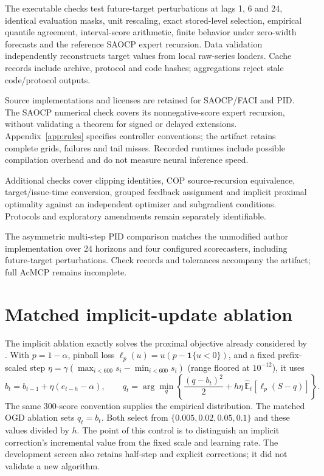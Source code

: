\documentclass[preprint,11pt]{elsarticle}
\newcommand{\ind}{\mathbf{1}}
\begin{document}
The executable checks test future-target perturbations at lags 1, 6 and 24, identical
evaluation masks, unit rescaling, exact stored-level selection, empirical quantile
agreement, interval-score arithmetic, finite behavior under zero-width forecasts and
the reference SAOCP expert recursion. Data validation independently reconstructs target
values from local raw-series loaders. Cache records include archive, protocol and code
hashes; aggregations reject stale code/protocol outputs.

Source implementations and licenses are retained for SAOCP/FACI and PID. The SAOCP
numerical check covers its nonnegative-score expert recursion, without validating a
theorem for signed or delayed extensions. Appendix~\ref{app:rules} specifies controller
conventions; the artifact retains complete grids, failures and tail misses. Recorded
runtimes include possible compilation overhead and do not measure neural inference speed.

Additional checks cover clipping identities, COP source-recursion equivalence,
target/issue-time conversion, grouped feedback assignment and implicit proximal
optimality against an independent optimizer and subgradient conditions. Protocols
and exploratory amendments remain separately identifiable.

The asymmetric multi-step PID comparison matches the unmodified author implementation
over 24 horizons and four configured scorecasters, including future-target perturbations.
Check records and tolerances accompany the artifact; full AcMCP remains incomplete.

\clearpage
\section{Matched implicit-update ablation}\label{app:implicit}
The implicit ablation exactly solves the proximal objective already considered by
\citet{hu2026cop}. With $p=1-\alpha$, pinball loss $\ell_p(u)=u(p-\ind\{u<0\})$,
and a fixed prefix-scaled step $\eta=\gamma(\max_{i<600}s_i-\min_{i<600}s_i)$
(range floored at $10^{-12}$), it uses
\begin{equation}\label{eq:prox}
 b_t=b_{t-1}+\eta(e_{t-h}-\alpha),\qquad
 q_t=\arg\min_q\left\{\frac{(q-b_t)^2}{2}
       +h\eta\,\widehat{\mathbb E}_t[\ell_p(S-q)]\right\}.
\end{equation}
The same 300-score convention supplies the empirical distribution. The matched OGD
ablation sets $q_t=b_t$. Both select from $\{0.005,0.02,0.05,0.1\}$ and these values
divided by $h$. The point of this control is to distinguish an implicit correction's
incremental value from the fixed scale and learning rate. The development screen also
retains half-step and explicit corrections; it did not validate a new algorithm.
\end{document}
